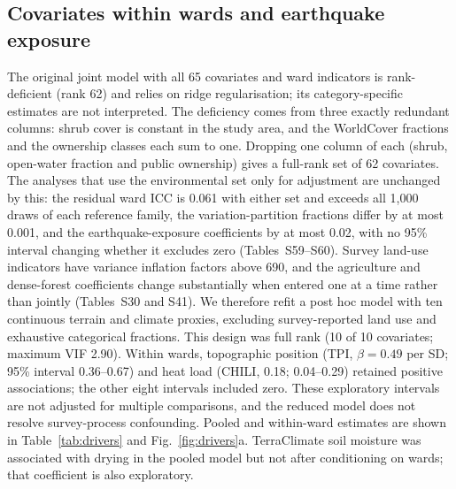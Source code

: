 \documentclass[preprint,12pt,authoryear]{elsarticle}
\begin{document}
\subsection{Covariates within wards and earthquake exposure}\label{sec:res-drivers}
The original joint model with all 65 covariates and ward indicators is rank-deficient (rank 62) and relies on ridge regularisation; its category-specific estimates are not interpreted. The deficiency comes from three exactly redundant columns: shrub cover is constant in the study area, and the WorldCover fractions and the ownership classes each sum to one. Dropping one column of each (shrub, open-water fraction and public ownership) gives a full-rank set of 62 covariates. The analyses that use the environmental set only for adjustment are unchanged by this: the residual ward ICC is 0.061 with either set and exceeds all 1,000 draws of each reference family, the variation-partition fractions differ by at most 0.001, and the earthquake-exposure coefficients by at most 0.02, with no 95\% interval changing whether it excludes zero (Tables~S59--S60). Survey land-use indicators have variance inflation factors above 690, and the agriculture and dense-forest coefficients change substantially when entered one at a time rather than jointly (Tables~S30 and S41). We therefore refit a post hoc model with ten continuous terrain and climate proxies, excluding survey-reported land use and exhaustive categorical fractions. This design was full rank (10 of 10 covariates; maximum VIF 2.90). Within wards, topographic position (TPI, $\beta = 0.49$ per SD; 95\% interval 0.36--0.67) and heat load (CHILI, 0.18; 0.04--0.29) retained positive associations; the other eight intervals included zero. These exploratory intervals are not adjusted for multiple comparisons, and the reduced model does not resolve survey-process confounding. Pooled and within-ward estimates are shown in Table~\ref{tab:drivers} and Fig.~\ref{fig:drivers}a. TerraClimate soil moisture was associated with drying in the pooled model but not after conditioning on wards; that coefficient is also exploratory.
\end{document}
